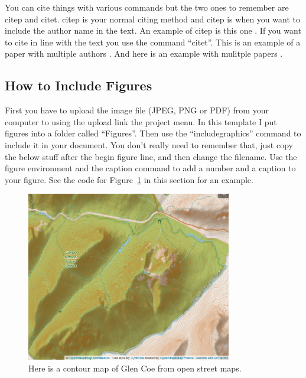 \documentclass[a4paper]{article}
\begin{document}
You can cite things with various commands but the two ones to remember are citep and citet. citep is your normal citing method and citep is when you want to include the author name in the text. An example of citep is this one \citep{gilbert_geology_1877}. If you want to cite \citet{morisawa_quantitative_1962} in line with the text you use the command ``citet''. This is an example of a paper with multiple authors \citep{clubb_differences_2020}. And here is an example with mulitple papers \citep{clubb_differences_2020, morisawa_quantitative_1962, gilbert_geology_1877}.

\subsection{How to Include Figures}

First you have to upload the image file (JPEG, PNG or PDF) from your computer to using the upload link the project menu. In this template I put figures into a folder called ``Figures''. Then use the ``includegraphics'' command to include it in your document. You don't really need to remember that, just copy the below stuff after the begin figure line, and then change the filename. Use the figure environment and the caption command to add a number and a caption to your figure. See the code for Figure~\ref{fig:glencoe} in this section for an example.

\begin{figure}
\centering
\includegraphics[width=0.8\textwidth]{Figures/glencoe_OSM.png}
\caption{Here is a contour map of Glen Coe from open street maps.}
\label{fig:glencoe}
\end{figure}
\end{document}
